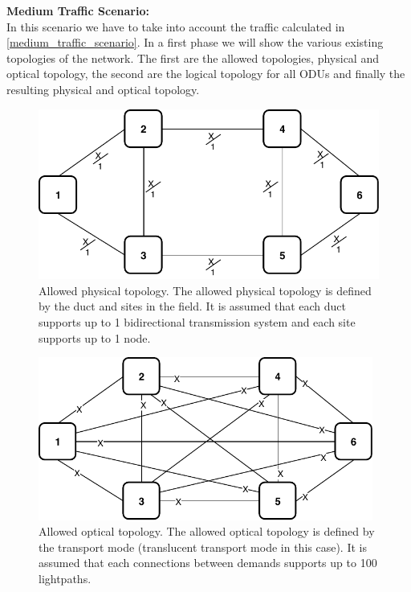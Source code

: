 \textbf{Medium Traffic Scenario:}\\

In this scenario we have to take into account the traffic calculated in \ref{medium_traffic_scenario}. In a first phase we will show the various existing topologies of the network. The first are the allowed topologies, physical and optical topology, the second are the logical topology for all ODUs and finally the resulting physical and optical topology.\\

\begin{figure}[h!]
\centering
\includegraphics[width=12cm]{sdf/ilp/translucent_protection/figures/allowed_physical_topology}
\caption{Allowed physical topology. The allowed physical topology is defined by the duct and sites in the field. It is assumed that each duct supports up to 1 bidirectional transmission system and each site supports up to 1 node.}
\label{allowed3_physical_protectionmedium}
\end{figure}
\newpage
\begin{figure}[h!]
\centering
\includegraphics[width=11cm]{sdf/ilp/translucent_protection/figures/allowed_optical_topology}
\caption{Allowed optical topology. The allowed optical topology is defined by the transport mode (translucent transport mode in this case). It is assumed that each connections between demands supports up to 100 lightpaths.}
\label{allowed3_optical_protectionmedium}
\end{figure}

